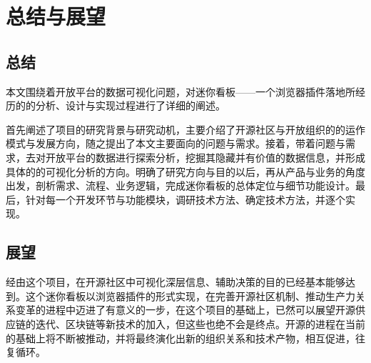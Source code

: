 \section{总结与展望}
\subsection{总结}
\par 本文围绕着开放平台的数据可视化问题，对迷你看板——一个浏览器插件落地所经历的的分析、设计与实现过程进行了详细的阐述。
\par 首先阐述了项目的研究背景与研究动机，主要介绍了开源社区与开放组织的的运作模式与发展方向，随之提出了本文主要面向的问题与需求。接着，带着问题与需求，去对开放平台的数据进行探索分析，挖掘其隐藏并有价值的数据信息，并形成具体的的可视化分析的方向。明确了研究方向与目的以后，再从产品与业务的角度出发，剖析需求、流程、业务逻辑，完成迷你看板的总体定位与细节功能设计。最后，针对每一个开发环节与功能模块，调研技术方法、确定技术方法，并逐个实现。

\subsection{展望}
\par 经由这个项目，在开源社区中可视化深层信息、辅助决策的目的已经基本能够达到。这个迷你看板以浏览器插件的形式实现，在完善开源社区机制、推动生产力关系变革的进程中迈进了有意义的一步，在这个项目的基础上，已然可以展望开源供应链的迭代、区块链等新技术的加入，但这些也绝不会是终点。开源的进程在当前的基础上将不断被推动，并将最终演化出新的组织关系和技术产物，相互促进，往复循环。